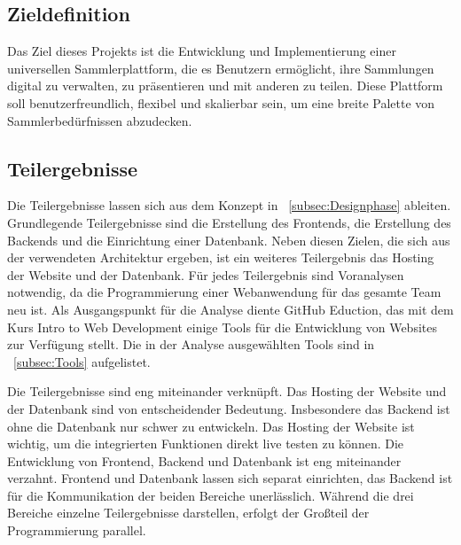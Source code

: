 \subsection{Zieldefinition}\label{subsec:Zieldefinition}
Das Ziel dieses Projekts ist die Entwicklung und Implementierung einer universellen Sammlerplattform, die es Benutzern ermöglicht, ihre Sammlungen digital zu verwalten, zu präsentieren und mit anderen zu teilen.
Diese Plattform soll benutzerfreundlich, flexibel und skalierbar sein, um eine breite Palette von Sammlerbedürfnissen abzudecken.

\subsection{Teilergebnisse}\label{subsec:Teilergebnisses}
Die Teilergebnisse lassen sich aus dem Konzept in ~\ref{subsec:Designphase} ableiten.
Grundlegende Teilergebnisse sind die Erstellung des Frontends, die Erstellung des Backends und die Einrichtung einer Datenbank.
Neben diesen Zielen, die sich aus der verwendeten Architektur ergeben, ist ein weiteres Teilergebnis das Hosting der Website und der Datenbank.
Für jedes Teilergebnis sind Voranalysen notwendig, da die Programmierung einer Webanwendung für das gesamte Team neu ist.
Als Ausgangspunkt für die Analyse diente GitHub Eduction, das mit dem Kurs Intro to Web Development einige Tools für die Entwicklung von Websites zur Verfügung stellt.
Die in der Analyse ausgewählten Tools sind in ~\ref{subsec:Tools} aufgelistet.

Die Teilergebnisse sind eng miteinander verknüpft.
Das Hosting der Website und der Datenbank sind von entscheidender Bedeutung.
Insbesondere das Backend ist ohne die Datenbank nur schwer zu entwickeln.
Das Hosting der Website ist wichtig, um die integrierten Funktionen direkt live testen zu können.
Die Entwicklung von Frontend, Backend und Datenbank ist eng miteinander verzahnt.
Frontend und Datenbank lassen sich separat einrichten, das Backend ist für die Kommunikation der beiden Bereiche unerlässlich.
Während die drei Bereiche einzelne Teilergebnisse darstellen, erfolgt der Großteil der Programmierung parallel.

